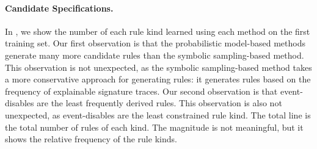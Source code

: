\documentclass[10pt,reprint,nocopyrightspace,numbers]{sigplanconf}
\begin{document}

\paragraph{Candidate Specifications.}

In , we show the number of each rule kind learned using each method on the first training set.
Our first observation is that the probabilistic model-based methods generate many more candidate rules than the symbolic sampling-based method.
This observation is not unexpected, as the symbolic sampling-based method takes a more conservative approach for generating rules: it generates rules based on the frequency of explainable signature traces.
Our second observation is that event-disables are the least frequently derived rules.
This observation is also not unexpected, as event-disables are the least constrained rule kind.
The total line is the total number of rules of each kind. The magnitude is not meaningful, but it shows the relative frequency of the rule kinds.
\end{document}
